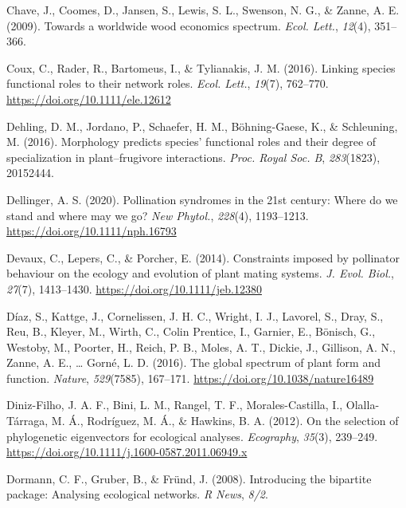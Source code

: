 \documentclass[
  12pt,
  a4paper,
]{article}
\newlength{\cslhangindent}
\newlength{\cslentryspacingunit} %
\newenvironment{CSLReferences}[2] %
 {%
  \setlength{\parindent}{0pt}
  \ifodd #1
  \let\oldpar\par
  \def\par{\hangindent=\cslhangindent\oldpar}
  \fi
  \setlength{\parskip}{#2\cslentryspacingunit}
 }%
 {}
\begin{document}
\begin{CSLReferences}{1}{0}
\leavevmode{}%
Chave, J., Coomes, D., Jansen, S., Lewis, S. L., Swenson, N. G., \& Zanne, A. E. (2009). Towards a worldwide wood economics spectrum. \emph{Ecol. Lett.}, \emph{12}(4), 351--366.

\leavevmode{}%
Coux, C., Rader, R., Bartomeus, I., \& Tylianakis, J. M. (2016). Linking species functional roles to their network roles. \emph{Ecol. Lett.}, \emph{19}(7), 762--770. \url{https://doi.org/10.1111/ele.12612}

\leavevmode{}%
Dehling, D. M., Jordano, P., Schaefer, H. M., Böhning-Gaese, K., \& Schleuning, M. (2016). Morphology predicts species' functional roles and their degree of specialization in plant--frugivore interactions. \emph{Proc. Royal Soc. B}, \emph{283}(1823), 20152444.

\leavevmode{}%
Dellinger, A. S. (2020). Pollination syndromes in the 21st century: Where do we stand and where may we go? \emph{New Phytol.}, \emph{228}(4), 1193--1213. \url{https://doi.org/10.1111/nph.16793}

\leavevmode{}%
Devaux, C., Lepers, C., \& Porcher, E. (2014). Constraints imposed by pollinator behaviour on the ecology and evolution of plant mating systems. \emph{J. Evol. Biol.}, \emph{27}(7), 1413--1430. \url{https://doi.org/10.1111/jeb.12380}

\leavevmode{}%
Díaz, S., Kattge, J., Cornelissen, J. H. C., Wright, I. J., Lavorel, S., Dray, S., Reu, B., Kleyer, M., Wirth, C., Colin Prentice, I., Garnier, E., Bönisch, G., Westoby, M., Poorter, H., Reich, P. B., Moles, A. T., Dickie, J., Gillison, A. N., Zanne, A. E., \ldots{} Gorné, L. D. (2016). The global spectrum of plant form and function. \emph{Nature}, \emph{529}(7585), 167--171. \url{https://doi.org/10.1038/nature16489}

\leavevmode{}%
Diniz-Filho, J. A. F., Bini, L. M., Rangel, T. F., Morales-Castilla, I., Olalla-Tárraga, M. Á., Rodríguez, M. Á., \& Hawkins, B. A. (2012). On the selection of phylogenetic eigenvectors for ecological analyses. \emph{Ecography}, \emph{35}(3), 239--249. \url{https://doi.org/10.1111/j.1600-0587.2011.06949.x}

\leavevmode{}%
Dormann, C. F., Gruber, B., \& Fründ, J. (2008). Introducing the bipartite package: Analysing ecological networks. \emph{R News}, \emph{8/2}.


\end{CSLReferences}
\end{document}

